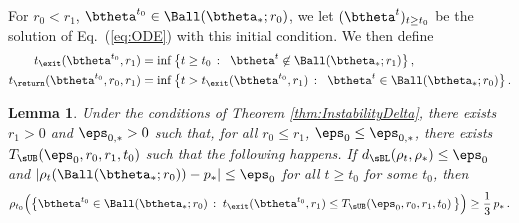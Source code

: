 \documentclass[11pt]{article}
\newtheorem{lemma}{Lemma}
\begin{document}
For $r_0<r_1$, $\btheta^{t_0}\in \Ball(\btheta_*;r_0)$, we let $(\btheta^t)_{t\ge t_0}$ be the solution of Eq.~(\ref{eq:ODE}) with this initial condition.
We then define 
%
\begin{align}
%
t_{\exit}(\btheta^{t_0},r_1) & = \inf\big\{t\ge t_0\,:\;\; \btheta^t\not\in \Ball(\btheta_*;r_1)\big\}\, ,\\
t_{\return}(\btheta^{t_0},r_0,r_1)& = \inf\big\{t> t_{\exit}(\btheta^{t_0},r_1) \,:\;\; \btheta^t\in \Ball(\btheta_*;r_0)\big\}\, .
%
\end{align}



\begin{lemma}\label{lem:Instability_lemma_first}
Under the conditions of Theorem \ref{thm:InstabilityDelta}, there exists $r_1>0$ and $\eps_{0,*}>0$ such that, for all $r_0\le r_1$, $\eps_0\le \eps_{0,*}$, there exists 
$T_{\sUB}(\eps_0,r_0,r_1, t_0)$ such that the following happens. 
If $d_{\sBL}(\rho_t,\rho_*)\le \eps_0$ and $|\rho_t(\Ball(\btheta_*;r_0))-p_*|\le \eps_0$ for all $t \ge t_0$ for some $t_0$, then
\begin{align}
%
\rho_{t_0}\Big(\big\{\btheta^{t_0} \in \Ball(\btheta_*;r_0)\, :\; t_{\exit}(\btheta^{t_0},r_1) \le T_{\sUB}(\eps_0,r_0,r_1, t_0)\,\big\}\Big)\ge \frac{1}{3}\, p_*\, .
\label{eq:ExitClaim}
%
\end{align}
\end{lemma}
%
\end{document}
